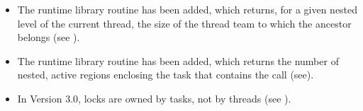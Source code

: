 \begin{itemize}
\item The  runtime library routine has been added, which returns, 
for a given nested level of the current thread, the size of the thread team to which the 
ancestor belongs (see 
).

\item The  runtime library routine has been added, which 
returns the number of nested, active  regions enclosing the task that 
contains the call (see\linebreak {}).

\item In Version 3.0, locks are owned by tasks, not by threads (see 
). 
\end{itemize}



